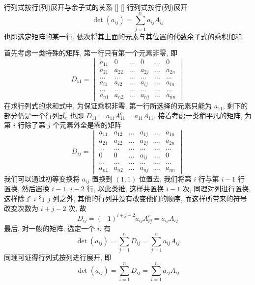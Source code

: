 \documentclass[UTF8]{ctexart}
\DeclareMathOperator{\0}{\mathbf{0}}
\DeclareMathOperator{\<}{\langle}
\renewcommand{\>}{\rangle}
\begin{document}
    \begin{thm}
			[]
			{行列式按行(列)展开与余子式的关系}
			[]
			[]
        行列式按行(列)展开\[
            \det(a_{ij})=\sum_{j=1}^na_{ij}A_{ij}\]
            也即选定矩阵的某一行, 依次将其上面的元素与其位置的代数余子式的乘积加和.
    \end{thm}
    \begin{prf}
        首先考虑一类特殊的矩阵, 第一行只有第一个元素非零, 即\[
        D_{11}=
        \begin{vmatrix}
        a_{11} & 0 & \ldots & 0 & \ldots & 0 \\
        a_{21} & a_{22} & \ldots & a_{2j} & \ldots & a_{2n} \\
        \ldots & \ldots & \ldots & \ldots & \ldots & \ldots \\
        a_{i1} & a_{i2} & \ldots & a_{ij} & \ldots & a_{in} \\
        \ldots & \ldots & \ldots & \ldots & \ldots & \ldots \\
        a_{n1} & a_{n2} & \ldots & a_{nj} & \ldots & a_{nn}
        \end{vmatrix}
            \]
        在求行列式的求和式中, 为保证乘积非零, 第一行所选择的元素只能为 \(a_{11}\), 剩下的部分仍是一个行列式, 也即 \(D_{11}=a_{11}A^{c}_{11}=a_{11}A_{11}\). 
        接着考虑一类稍平凡的矩阵, 为第 \(i\) 行除了第 \(j\) 个元素外全是零的矩阵
        \[D_{ij}=
        \begin{vmatrix}
        a_{11} & a_{12} & \ldots & a_{1j} & \ldots & a_{1n} \\
        a_{21} & a_{22} & \ldots & a_{2j} & \ldots & a_{2n} \\
        \ldots & \ldots & \ldots & \ldots & \ldots & \ldots \\
        0 & 0 & \ldots & a_{ij} & \ldots & 0 \\
        \ldots & \ldots & \ldots & \ldots & \ldots & \ldots \\
        a_{n1} & a_{n2} & \ldots & a_{nj} & \ldots & a_{nn}
        \end{vmatrix}\]
        我们可以通过初等变换将 \(a_{ij}\) 置换到 \((1,1)\) 位置去, 我们将第 \(i\) 行与第 \(i-1\) 行置换, 然后置换 \(i-1\), \(i-2\) 行, 以此类推, 这样共置换 \(i-1\) 次, 同理对列进行置换,这样除了 \(i\) 行 \(j\) 列之外, 其他的行列并没有改变他们的顺序, 而这样所带来的符号改变次数为 \(i+j-2\) 次, 故\[D_{ij}=(-1)^{i+j-2}a_{ij}A^{c}_{ij}=a_{ij}A_{ij}\]
        最后, 对一般的矩阵, 选定一个 \(i\), 有
        \[
        \det(a_{ij})=\sum_{j=1}^nD_{ij}=\sum_{j=1}^na_{ij}A_{ij}
        \]
        同理可证得行列式按列进行展开, 即\[
        \det(a_{ij})=\sum_{i=1}^nD_{ij}=\sum_{i=1}^na_{ij}A_{ij}
        \]
        \end{prf}
\end{document}
